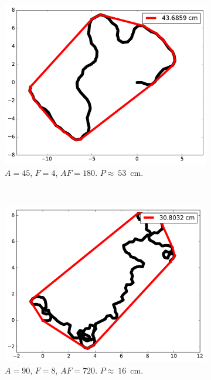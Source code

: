 \begin{figure}[htb]
\begin{subfigure}[t]{\subImgWmo}
			\centering
			\includegraphics[width=\textwidth]{figures/ch3/areaTraj_2_19_45_4}
			\caption{$A = 45$, $F=4$, $AF=180$. $P\approx~53$~cm.}
			\label{fig:areaTraj_2_19_45_4}
		\end{subfigure}
		~
		\begin{subfigure}[t]{\subImgWmo}
			\centering
			\includegraphics[width=\textwidth]{figures/ch3/areaTraj_2_19_90_8}
			\caption{$A = 90$, $F=8$, $AF=720$. $P\approx~16$~cm.}
			\label{fig:areaTraj_2_19_90_8}
		\end{subfigure}
		~
		\begin{subfigure}[t]{\subImgWmo}
			\centering

\end{subfigure}
\end{figure}
